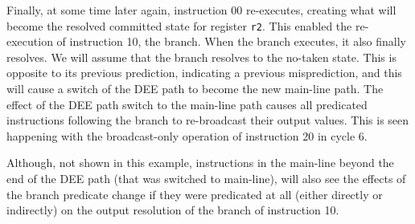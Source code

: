 Finally, at some time later again, instruction 00
re-executes, creating what will become the resolved committed
state for register
{\tt r2}.
This enabled the re-execution of instruction 10, the branch.
When the branch executes, it also finally resolves.
We will assume that the branch resolves to the no-taken
state.  This is opposite to its previous prediction, indicating
a previous misprediction, and this will cause a switch of the
DEE path to become the new main-line path.
The effect of the DEE path switch to the main-line path
causes all predicated instructions following the branch
to re-broadcast their output values.  This is seen
happening with the broadcast-only operation of
instruction 20 in cycle 6.

Although, not shown in this example, instructions in the main-line
beyond the end of the DEE path (that was switched to main-line),
will also see the effects of the branch predicate change
if they were predicated at all (either directly or indirectly)
on the output resolution of the branch of instruction 10.


